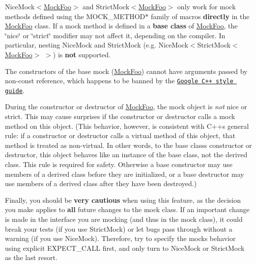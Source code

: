 \begin{DoxyEnumerate}
\item {\ttfamily Nice\+Mock$<$\hyperlink{class_mock_foo}{Mock\+Foo}$>$} and {\ttfamily Strict\+Mock$<$\hyperlink{class_mock_foo}{Mock\+Foo}$>$} only work for mock methods defined using the {\ttfamily M\+O\+C\+K\+\_\+\+M\+E\+T\+H\+O\+D$\ast$} family of macros {\bfseries directly} in the {\ttfamily \hyperlink{class_mock_foo}{Mock\+Foo}} class. If a mock method is defined in a {\bfseries base class} of {\ttfamily \hyperlink{class_mock_foo}{Mock\+Foo}}, the \char`\"{}nice\char`\"{} or \char`\"{}strict\char`\"{} modifier may not affect it, depending on the compiler. In particular, nesting {\ttfamily Nice\+Mock} and {\ttfamily Strict\+Mock} (e.\+g. {\ttfamily Nice\+Mock$<$Strict\+Mock$<$\hyperlink{class_mock_foo}{Mock\+Foo}$>$ $>$}) is {\bfseries not} supported.
\end{DoxyEnumerate}
\begin{DoxyEnumerate}
\item The constructors of the base mock ({\ttfamily \hyperlink{class_mock_foo}{Mock\+Foo}}) cannot have arguments passed by non-\/const reference, which happens to be banned by the \href{http://google-styleguide.googlecode.com/svn/trunk/cppguide.xml}{\tt Google C++ style guide}.
\end{DoxyEnumerate}
\begin{DoxyEnumerate}
\item During the constructor or destructor of {\ttfamily \hyperlink{class_mock_foo}{Mock\+Foo}}, the mock object is {\itshape not} nice or strict. This may cause surprises if the constructor or destructor calls a mock method on {\ttfamily this} object. (This behavior, however, is consistent with C++\textquotesingle{}s general rule\+: if a constructor or destructor calls a virtual method of {\ttfamily this} object, that method is treated as non-\/virtual. In other words, to the base class\textquotesingle{}s constructor or destructor, {\ttfamily this} object behaves like an instance of the base class, not the derived class. This rule is required for safety. Otherwise a base constructor may use members of a derived class before they are initialized, or a base destructor may use members of a derived class after they have been destroyed.)
\end{DoxyEnumerate}

Finally, you should be {\bfseries very cautious} when using this feature, as the decision you make applies to {\bfseries all} future changes to the mock class. If an important change is made in the interface you are mocking (and thus in the mock class), it could break your tests (if you use {\ttfamily Strict\+Mock}) or let bugs pass through without a warning (if you use {\ttfamily Nice\+Mock}). Therefore, try to specify the mock\textquotesingle{}s behavior using explicit {\ttfamily E\+X\+P\+E\+C\+T\+\_\+\+C\+A\+LL} first, and only turn to {\ttfamily Nice\+Mock} or {\ttfamily Strict\+Mock} as the last resort.

